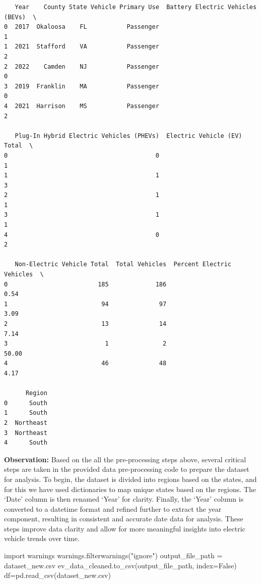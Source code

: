 \documentclass[
  letterpaper,
  DIV=11,
  numbers=noendperiod]{scrartcl}
\newenvironment{Shaded}{\begin{snugshade}}{\end{snugshade}}
\newcommand{\ImportTok}[1]{\textcolor[rgb]{0.00,0.46,0.62}{#1}}
\newcommand{\NormalTok}[1]{\textcolor[rgb]{0.00,0.23,0.31}{#1}}
\newcommand{\OperatorTok}[1]{\textcolor[rgb]{0.37,0.37,0.37}{#1}}
\newcommand{\StringTok}[1]{\textcolor[rgb]{0.13,0.47,0.30}{#1}}
\newcommand{\VariableTok}[1]{\textcolor[rgb]{0.07,0.07,0.07}{#1}}
\begin{document}
\begin{verbatim}
   Year    County State Vehicle Primary Use  Battery Electric Vehicles (BEVs)  \
0  2017  Okaloosa    FL           Passenger                                 1   
1  2021  Stafford    VA           Passenger                                 2   
2  2022    Camden    NJ           Passenger                                 0   
3  2019  Franklin    MA           Passenger                                 0   
4  2021  Harrison    MS           Passenger                                 2   

   Plug-In Hybrid Electric Vehicles (PHEVs)  Electric Vehicle (EV) Total  \
0                                         0                            1   
1                                         1                            3   
2                                         1                            1   
3                                         1                            1   
4                                         0                            2   

   Non-Electric Vehicle Total  Total Vehicles  Percent Electric Vehicles  \
0                         185             186                       0.54   
1                          94              97                       3.09   
2                          13              14                       7.14   
3                           1               2                      50.00   
4                          46              48                       4.17   

      Region  
0      South  
1      South  
2  Northeast  
3  Northeast  
4      South  
\end{verbatim}

\textbf{Observation:} Based on the all the pre-processing steps above,
several critical steps are taken in the provided data pre-processing
code to prepare the dataset for analysis. To begin, the dataset is
divided into regions based on the states, and for this we have used
dictionaries to map unique states based on the regions. The `Date'
column is then renamed `Year' for clarity. Finally, the `Year' column is
converted to a datetime format and refined further to extract the year
component, resulting in consistent and accurate date data for analysis.
These steps improve data clarity and allow for more meaningful insights
into electric vehicle trends over time.

\begin{Shaded}
\begin{Highlighting}[]
\ImportTok{import}\NormalTok{ warnings}
\NormalTok{warnings.filterwarnings(}\StringTok{"ignore"}\NormalTok{)}
\NormalTok{output\_file\_path }\OperatorTok{=} \StringTok{\textquotesingle{}dataset\_new.csv\textquotesingle{}}
\NormalTok{ev\_data\_cleaned.to\_csv(output\_file\_path, index}\OperatorTok{=}\VariableTok{False}\NormalTok{)}
\NormalTok{df}\OperatorTok{=}\NormalTok{pd.read\_csv(}\StringTok{\textquotesingle{}dataset\_new.csv\textquotesingle{}}\NormalTok{)}
\end{Highlighting}
\end{Shaded}
\end{document}

